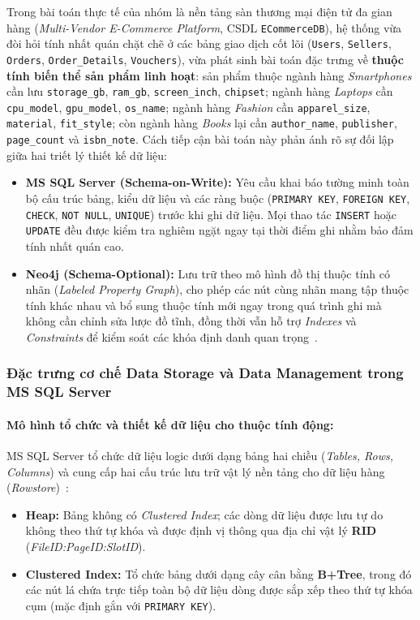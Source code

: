 Trong bài toán thực tế của nhóm là nền tảng sàn thương mại điện tử đa gian hàng (\textit{Multi-Vendor E-Commerce Platform}, CSDL \texttt{ECommerceDB}), hệ thống vừa đòi hỏi tính nhất quán chặt chẽ ở các bảng giao dịch cốt lõi (\texttt{Users}, \texttt{Sellers}, \texttt{Orders}, \texttt{Order\_Details}, \texttt{Vouchers}), vừa phát sinh bài toán đặc trưng về \textbf{thuộc tính biến thể sản phẩm linh hoạt}: sản phẩm thuộc ngành hàng \textit{Smartphones} cần lưu \texttt{storage\_gb}, \texttt{ram\_gb}, \texttt{screen\_inch}, \texttt{chipset}; ngành hàng \textit{Laptops} cần \texttt{cpu\_model}, \texttt{gpu\_model}, \texttt{os\_name}; ngành hàng \textit{Fashion} cần \texttt{apparel\_size}, \texttt{material}, \texttt{fit\_style}; còn ngành hàng \textit{Books} lại cần \texttt{author\_name}, \texttt{publisher}, \texttt{page\_count} và \texttt{isbn\_note}. Cách tiếp cận bài toán này phản ánh rõ sự đối lập giữa hai triết lý thiết kế dữ liệu:

\begin{itemize}
  \item \textbf{MS SQL Server (Schema-on-Write):} Yêu cầu khai báo tường minh toàn bộ cấu trúc bảng, kiểu dữ liệu và các ràng buộc (\texttt{PRIMARY KEY}, \texttt{FOREIGN KEY}, \texttt{CHECK}, \texttt{NOT NULL}, \texttt{UNIQUE}) trước khi ghi dữ liệu. Mọi thao tác \texttt{INSERT} hoặc \texttt{UPDATE} đều được kiểm tra nghiêm ngặt ngay tại thời điểm ghi nhằm bảo đảm tính nhất quán cao.
  \item \textbf{Neo4j (Schema-Optional):} Lưu trữ theo mô hình đồ thị thuộc tính có nhãn (\textit{Labeled Property Graph}), cho phép các nút cùng nhãn mang tập thuộc tính khác nhau và bổ sung thuộc tính mới ngay trong quá trình ghi mà không cần chỉnh sửa lược đồ tĩnh, đồng thời vẫn hỗ trợ \textit{Indexes} và \textit{Constraints} để kiểm soát các khóa định danh quan trọng~\cite{t1_robinson2015,t1_neo4jops}.
\end{itemize}

\subsubsection{Đặc trưng cơ chế Data Storage và Data Management trong MS SQL Server}

\paragraph{Mô hình tổ chức và thiết kế dữ liệu cho thuộc tính động:}
MS SQL Server tổ chức dữ liệu logic dưới dạng bảng hai chiều (\textit{Tables, Rows, Columns}) và cung cấp hai cấu trúc lưu trữ vật lý nền tảng cho dữ liệu hàng (\textit{Rowstore})~\cite{t1_delaney2012,t1_mspages}:
\begin{itemize}
  \item \textbf{Heap:} Bảng không có \textit{Clustered Index}; các dòng dữ liệu được lưu tự do không theo thứ tự khóa và được định vị thông qua địa chỉ vật lý \textbf{RID} (\textit{FileID:PageID:SlotID}).
  \item \textbf{Clustered Index:} Tổ chức bảng dưới dạng cây cân bằng \textbf{B+Tree}, trong đó các nút lá chứa trực tiếp toàn bộ dữ liệu dòng được sắp xếp theo thứ tự khóa cụm (mặc định gắn với \texttt{PRIMARY KEY}).
\end{itemize}

